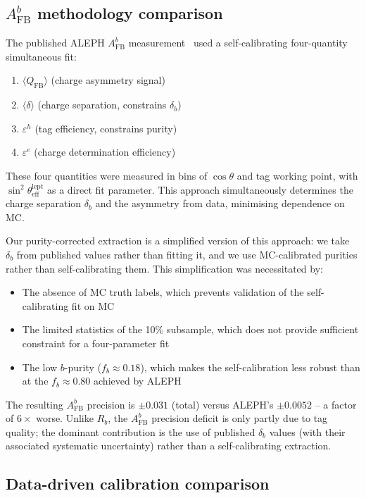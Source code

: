 \documentclass[11pt,a4paper]{article}
\begin{document}
\subsection{$A_\text{FB}^b$ methodology comparison}
\label{sec:method:afb}

The published ALEPH $A_\text{FB}^b$ measurement~\cite{ALEPH:AFBb}
used a self-calibrating four-quantity simultaneous fit:
\begin{enumerate}
\item $\langle Q_\text{FB}\rangle$ (charge asymmetry signal)
\item $\langle\delta\rangle$ (charge separation, constrains $\delta_b$)
\item $\varepsilon^h$ (tag efficiency, constrains purity)
\item $\varepsilon^e$ (charge determination efficiency)
\end{enumerate}
These four quantities were measured in bins of $\cos\theta$ and
tag working point, with $\sin^2\theta_\text{eff}^\text{lept}$ as
a direct fit parameter.
This approach simultaneously determines the charge separation
$\delta_b$ and the asymmetry from data, minimising dependence on
MC.

Our purity-corrected extraction is a simplified version of this
approach: we take $\delta_b$ from published values rather than
fitting it, and we use MC-calibrated purities rather than
self-calibrating them.
This simplification was necessitated by:
\begin{itemize}
\item The absence of MC truth labels, which prevents validation
  of the self-calibrating fit on MC
\item The limited statistics of the 10\% subsample, which does
  not provide sufficient constraint for a four-parameter fit
\item The low $b$-purity ($f_b \approx 0.18$), which makes the
  self-calibration less robust than at the $f_b \approx 0.80$
  achieved by ALEPH
\end{itemize}

The resulting $A_\text{FB}^b$ precision is
$\pm 0.031$ (total) versus ALEPH's $\pm 0.0052$ -- a factor
of $6\times$ worse.
Unlike $R_b$, the $A_\text{FB}^b$ precision deficit is only
partly due to tag quality; the dominant contribution is the
use of published $\delta_b$ values (with their associated
systematic uncertainty) rather than a self-calibrating extraction.

\subsection{Data-driven calibration comparison}
\label{sec:method:calibration}
\end{document}
